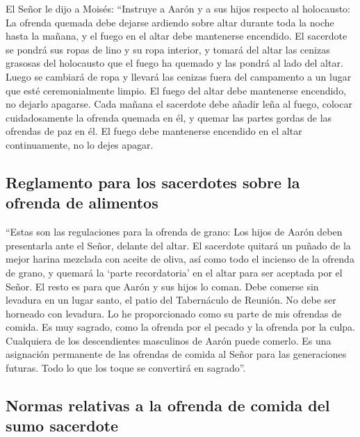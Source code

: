  El Señor le dijo a Moisés:  ``Instruye a
Aarón y a sus hijos respecto al holocausto: La ofrenda quemada debe
dejarse ardiendo sobre altar durante toda la noche hasta la mañana, y el
fuego en el altar debe mantenerse encendido.  El
sacerdote se pondrá sus ropas de lino y su ropa interior, y tomará del
altar las cenizas grasosas del holocausto que el fuego ha quemado y las
pondrá al lado del altar.  Luego se cambiará de ropa y
llevará las cenizas fuera del campamento a un lugar que esté
ceremonialmente limpio.  El fuego del altar debe
mantenerse encendido, no dejarlo apagarse. Cada mañana el sacerdote debe
añadir leña al fuego, colocar cuidadosamente la ofrenda quemada en él, y
quemar las partes gordas de las ofrendas de paz en él. 
El fuego debe mantenerse encendido en el altar continuamente, no lo
dejes apagar.

\hypertarget{reglamento-para-los-sacerdotes-sobre-la-ofrenda-de-alimentos}{%
\subsection{Reglamento para los sacerdotes sobre la ofrenda de
alimentos}\label{reglamento-para-los-sacerdotes-sobre-la-ofrenda-de-alimentos}}

 ``Estas son las regulaciones para la ofrenda de grano:
Los hijos de Aarón deben presentarla ante el Señor, delante del altar.
 El sacerdote quitará un puñado de la mejor harina
mezclada con aceite de oliva, así como todo el incienso de la ofrenda de
grano, y quemará la `parte recordatoria' en el altar para ser aceptada
por el Señor.  El resto es para que Aarón y sus hijos lo
coman. Debe comerse sin levadura en un lugar santo, el patio del
Tabernáculo de Reunión.  No debe ser horneado con
levadura. Lo he proporcionado como su parte de mis ofrendas de comida.
Es muy sagrado, como la ofrenda por el pecado y la ofrenda por la culpa.
 Cualquiera de los descendientes masculinos de Aarón
puede comerlo. Es una asignación permanente de las ofrendas de comida al
Señor para las generaciones futuras. Todo lo que los toque se convertirá
en sagrado''.

\hypertarget{normas-relativas-a-la-ofrenda-de-comida-del-sumo-sacerdote}{%
\subsection{Normas relativas a la ofrenda de comida del sumo
sacerdote}\label{normas-relativas-a-la-ofrenda-de-comida-del-sumo-sacerdote}}

